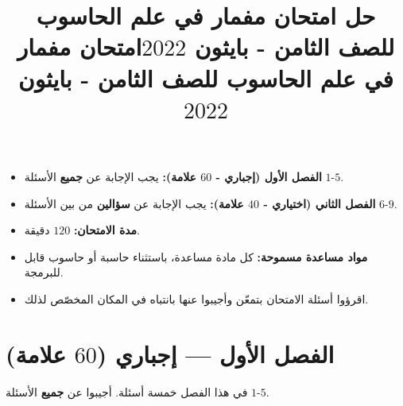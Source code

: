 \documentclass[14pt]{extarticle}
\title{حل امتحان مفمار في علم الحاسوب للصف الثامن - بايثون $2022$}
\title{امتحان مفمار في علم الحاسوب للصف الثامن - بايثون $2022$}
\begin{document}
\maketitle
\thispagestyle{fancy}

\ifwithsols
\else
\begin{boxCode}
\begin{itemize}[nosep]
    \item \textbf{الفصل الأول (إجباري - $60$ علامة):} يجب الإجابة عن \textbf{جميع} الأسئلة $1$-$5$.
    \item \textbf{الفصل الثاني (اختياري - $40$ علامة):} يجب الإجابة عن \textbf{سؤالين} من بين الأسئلة $6$-$9$.
    \item \textbf{مدة الامتحان:} $120$ دقيقة.
    \item \textbf{مواد مساعدة مسموحة:} كل مادة مساعدة، باستثناء حاسبة أو حاسوب قابل للبرمجة.
    \item اقرؤوا أسئلة الامتحان بتمعّن وأجيبوا عنها بانتباه في المكان المخصّص لذلك.
\end{itemize}
\end{boxCode}
\fi

\section*{الفصل الأول — إجباري ($60$ علامة)}
في هذا الفصل خمسة أسئلة. أجيبوا عن \textbf{جميع} الأسئلة $1$-$5$.
\end{document}
